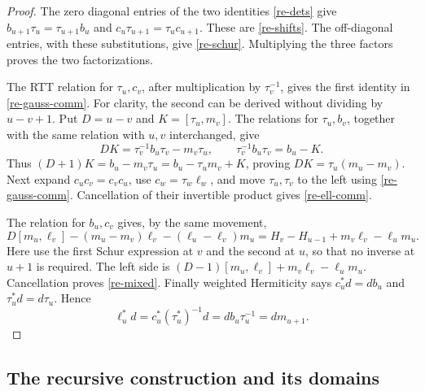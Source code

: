 \begin{proof}
The zero diagonal entries of the two identities
\eqref{re-dets} give
\(b_{u+1}\tau_u=\tau_{u+1}b_u\) and
\(c_u\tau_{u+1}=\tau_uc_{u+1}\).
These are \eqref{re-shifts}.  The off-diagonal entries,
with these substitutions, give \eqref{re-schur}.
Multiplying the three factors proves the two factorizations.

The RTT relation for \(\tau_u,c_v\), after multiplication
by \(\tau_v^{-1}\), gives the first identity in
\eqref{re-gauss-comm}.  For clarity, the second can be
derived without dividing by \(u-v+1\).
Put \(D=u-v\) and \(K=[\tau_u,m_v]\).
The relations for \(\tau_u,b_v\), together with the same
relation with \(u,v\) interchanged, give
\[
 DK=\tau_v^{-1}b_u\tau_v-m_v\tau_u,\qquad
 \tau_v^{-1}b_u\tau_v=b_u-K.
\]
Thus \((D+1)K=b_u-m_v\tau_u
=b_u-\tau_um_v+K\), proving \(DK=\tau_u(m_u-m_v)\).
Next expand \(c_uc_v=c_vc_u\), use
\(c_w=\tau_w\ell_w\), and move \(\tau_u,\tau_v\)
to the left using \eqref{re-gauss-comm}.
Cancellation of their invertible product gives
\eqref{re-ell-comm}.

The relation for \(b_u,c_v\) gives, by the same movement,
\[
 D[m_u,\ell_v]-(m_u-m_v)\ell_v-(\ell_u-\ell_v)m_u
       =H_v-H_{u-1}+m_v\ell_v-\ell_um_u.
\]
Here use the first Schur expression at \(v\) and the second
at \(u\), so that no inverse at \(u+1\) is required.
The left side is
\((D-1)[m_u,\ell_v]+m_v\ell_v-\ell_um_u\).
Cancellation proves \eqref{re-mixed}.
Finally weighted Hermiticity says \(c_u^*d=db_u\) and
\(\tau_u^*d=d\tau_u\).  Hence
\[
 \ell_u^*d=c_u^*(\tau_u^*)^{-1}d
                    =db_u\tau_u^{-1}=dm_{u+1}.
\]
\end{proof}

\subsection{The recursive construction and its domains}

